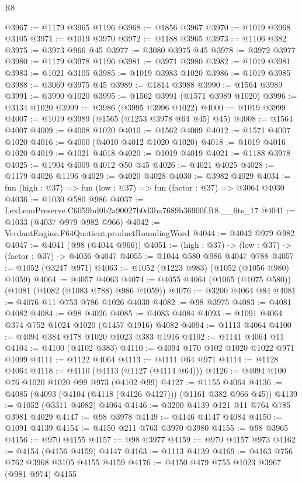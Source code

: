 \begin{lexlean}{R8}
\begin{coremodule}
@3967 := @1179 @3965 @1196
@3968 := @1856 @3967
@3970 := @1019 @3968 @3105
@3971 := @1019 @3970
@3972 := @1188 @3965
@3973 := @1106 @382
@3975 := @3973 @966 @45
@3977 := @3080 @3975 @45
@3978 := @3972 @3977
@3980 := @1179 @3978 @1196
@3981 := @3971 @3980
@3982 := @1019 @3981
@3983 := @1021 @3105
@3985 := @1019 @3983 @1020
@3986 := @1019 @3985
@3988 := @3069 @3975 @45
@3989 := @1814 @3988
@3990 := @1564 @3989
@3991 := @3990 @1020
@3995 := @1562 @3991 (@1571 @3989 @1020)
@3996 := @3134 @1020
@3999 := @3986 (@3995 @3996 @1022)
@4000 := @1019 @3999
@4007 := @1019 @3989 (@1565 (@1253 @3978 @64 @45) @45)
@4008 := @1564 @4007
@4009 := @4008 @1020
@4010 := @1562 @4009
@4012 := @1571 @4007 @1020
@4016 := @4000 (@4010 @4012 @1020 @1020)
@4018 := @1019 @4016 @1020
@4019 := @1021 @4018
@4020 := @1019 @4019
@4021 := @1188 @3978
@4025 := @1904 @4009 @4012 @50 @45
@4026 := @4021 @4025
@4028 := @1179 @4026 @1196
@4029 := @4020 @4028
@4030 := @3982 @4029
@4034 := fun (high : @37) => fun (low : @37) => fun (factor : @37) => @3064 @4030
@4036 := @1030 @580 @986
@4037 := LexLeanPreserve.C6059bd0b2a90027b0d3ba7689b36900f.R8.__fits_17
@4041 := @1033 (@4037 @979 @982 @966)
@4042 := VerdantEngine.F64Quotient.productRoundingWord
@4044 := @4042 @979 @982
@4047 := @4041 (@98 (@4044 @966))
@4051 := (high : @37) -> (low : @37) -> (factor : @37) -> @4036 @4047
@4055 := @1044 @580 @986 @4047 @788
@4057 := @1052 (@3247 @971)
@4063 := @1052 (@1223 @983) (@1052 (@1056 @980) @1059)
@4064 := @4057 @4063
@4074 := @4055 @4064 (@1065 (@1075 @580)) (@1081 (@1082 (@1083 @788) @986 @1059))
@4076 := @3200 @4064 @84
@4081 := @4076 @11 @753 @786 @1026 @4030
@4082 := @98 @3975
@4083 := @4081 @4082
@4084 := @98 @4026
@4085 := @4083 @4084
@4093 := @1091 @4064 @374 @752 @1024 @1020 (@1457 @1916) @4082
@4094 := @1113 @4064
@4100 := @4094 @384 @178 @1020 @1023 @383 @1916
@4102 := @1141 @4064 @11
@4104 := @4100 (@4102 @383)
@4110 := @4094 @170 @102 @1020 @1022 @971 @1099
@4111 := @1122 @4064
@4113 := @4111 @64 @971
@4114 := @1128 @4064
@4118 := @4110 (@4113 (@1127 (@4114 @64)))
@4126 := @4094 @100 @76 @1020 @1020 @99 @973 (@4102 @99)
@4127 := @1155 @4064
@4136 := @4085 (@4093 (@4104 (@4118 (@4126 @4127))) (@1161 @382 @966 @45))
@4139 := @1052 (@3311 @4082) @4064
@4146 := @3200 @4139 @121 @11 @764 @785 @3981 @4029
@4147 := @98 @3978
@4149 := @4146 @4147 @4084
@4150 := @1091 @4139
@4154 := @4150 @211 @763 @3970 @3980
@4155 := @98 @3965
@4156 := @970 @4155
@4157 := @98 @3977
@4159 := @970 @4157 @973
@4162 := @4154 (@4156 @4159) @4147
@4163 := @1113 @4139
@4169 := @4163 @756 @762 @3968 @3105 @4155 @4159
@4176 := @4150 @479 @755 @1023 @3967 (@981 @974) @4155

\end{coremodule}
\end{lexlean}
